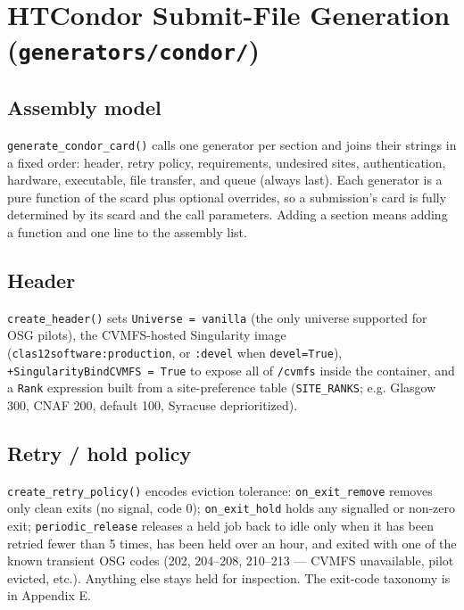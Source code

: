 \section{HTCondor Submit-File Generation (\texttt{generators/\allowbreak{}condor/\allowbreak{}})}\label{ch:8}

\subsection{Assembly model}

\texttt{generate\_\allowbreak{}condor\_\allowbreak{}card()} calls one generator per section and joins their
strings in a fixed order: header, retry policy, requirements, undesired sites, authentication, hardware,
executable, file transfer, and queue (always last). Each generator is a pure function of the scard plus
optional overrides, so a submission's card is fully determined by its scard and the call parameters. Adding a
section means adding a function and one line to the assembly list.

\subsection{Header}

\texttt{create\_\allowbreak{}header()} sets \texttt{Universe =\allowbreak{} vanilla} (the only universe
supported for OSG pilots), the CVMFS-hosted Singularity image (\texttt{clas12software:\allowbreak{}production},
or \texttt{:\allowbreak{}devel} when \texttt{devel=\allowbreak{}True}), \texttt{+SingularityBindCVMFS
=\allowbreak{} True} to expose all of \texttt{/\allowbreak{}cvmfs} inside the container, and a \texttt{Rank}
expression built from a site-preference table (\texttt{SITE\_\allowbreak{}RANKS}; e.g. Glasgow 300, CNAF 200,
default 100, Syracuse deprioritized).

\subsection{Retry / hold policy}

\texttt{create\_\allowbreak{}retry\_\allowbreak{}policy()} encodes eviction tolerance:
\texttt{on\_\allowbreak{}exit\_\allowbreak{}remove} removes only clean exits (no signal, code 0);
\texttt{on\_\allowbreak{}exit\_\allowbreak{}hold} holds any signalled or non-zero exit;
\texttt{periodic\_\allowbreak{}release} releases a held job back to idle only when it has been retried fewer
than 5 times, has been held over an hour, and exited with one of the known transient OSG codes (202, 204--208,
210--213 --- CVMFS unavailable, pilot evicted, etc.). Anything else stays held for inspection. The exit-code
taxonomy is in Appendix E.

